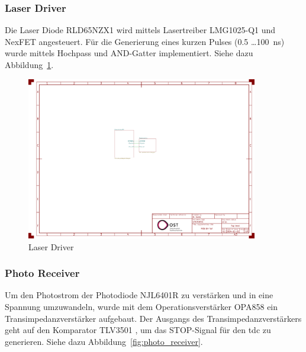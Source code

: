 \documentclass[11pt,a4paper,hidelinks]{article}
\begin{document}
\subsubsection{Laser Driver}

Die Laser Diode RLD65NZX1 \cite{rohm2019rld65nzx1_datasheet} wird mittels Lasertreiber LMG1025-Q1 \cite{ti2024lmg1025q1_datasheet} und NexFET \cite{ti2016csd17578q3a_datasheet} angesteuert. Für die Generierung eines kurzen Pulses (0.5 \dots 100~ns) wurde mittels Hochpass und AND-Gatter \cite{diodes202074lvc1g08q_datasheet} implementiert. Siehe dazu Abbildung~\ref{fig:laser_driver}.

\begin{figure}[H]
    \centering
    \includegraphics[page=3, trim=100 520 550 60, clip, width=0.9\textwidth]{attachments/schematic.pdf}
    \caption{Laser Driver}\label{fig:laser_driver}
\end{figure}

\subsubsection{Photo Receiver}\label{sec:schematic_photo_receiver}

Um den Photostrom der Photodiode NJL6401R \cite{jrc2014njl6401r3_datasheet} zu verstärken und in eine Spannung umzuwandeln, wurde mit dem Operationsverstärker OPA858 \cite{ti2018opa858_datasheet} ein Transimpedanzverstärker aufgebaut. Der Ausgangs des Transimpedanzverstärkers geht auf den Komparator TLV3501 \cite{ti2016tlv3501_datasheet}, um das STOP-Signal für den \acrshort{tdc} zu generieren. Siehe dazu Abbildung~\ref{fig:photo_receiver}.
\end{document}
